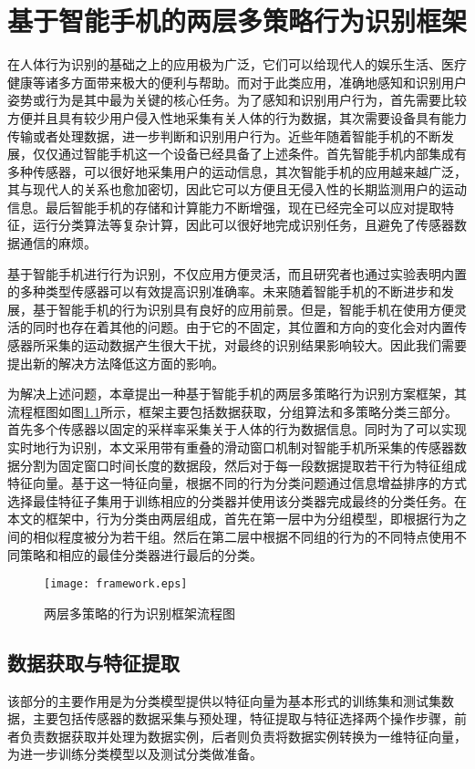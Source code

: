 \chapter{基于智能手机的两层多策略行为识别框架}

\par 在人体行为识别的基础之上的应用极为广泛，它们可以给现代人的娱乐生活、医疗健康等诸多方面带来极大的便利与帮助。而对于此类应用，准确地感知和识别用户姿势或行为是其中最为关键的核心任务。为了感知和识别用户行为，首先需要比较方便并且具有较少用户侵入性地采集有关人体的行为数据，其次需要设备具有能力传输或者处理数据，进一步判断和识别用户行为。近些年随着智能手机的不断发展，仅仅通过智能手机这一个设备已经具备了上述条件。首先智能手机内部集成有多种传感器，可以很好地采集用户的运动信息，其次智能手机的应用越来越广泛，其与现代人的关系也愈加密切，因此它可以方便且无侵入性的长期监测用户的运动信息。最后智能手机的存储和计算能力不断增强，现在已经完全可以应对提取特征，运行分类算法等复杂计算，因此可以很好地完成识别任务，且避免了传感器数据通信的麻烦。
\par 基于智能手机进行行为识别，不仅应用方便灵活，而且研究者也通过实验表明内置的多种类型传感器可以有效提高识别准确率。未来随着智能手机的不断进步和发展，基于智能手机的行为识别具有良好的应用前景。但是，智能手机在使用方便灵活的同时也存在着其他的问题。由于它的不固定，其位置和方向的变化会对内置传感器所采集的运动数据产生很大干扰，对最终的识别结果影响较大。因此我们需要提出新的解决方法降低这方面的影响。
\par 为解决上述问题，本章提出一种基于智能手机的两层多策略行为识别方案框架，其流程框图如图\ref{framework}所示，框架主要包括数据获取，分组算法和多策略分类三部分。首先多个传感器以固定的采样率采集关于人体的行为数据信息。同时为了可以实现实时地行为识别，本文采用带有重叠的滑动窗口机制对智能手机所采集的传感器数据分割为固定窗口时间长度的数据段，然后对于每一段数据提取若干行为特征组成特征向量。基于这一特征向量，根据不同的行为分类问题通过信息增益排序的方式选择最佳特征子集用于训练相应的分类器并使用该分类器完成最终的分类任务。在本文的框架中，行为分类由两层组成，首先在第一层中为分组模型，即根据行为之间的相似程度被分为若干组。然后在第二层中根据不同组的行为的不同特点使用不同策略和相应的最佳分类器进行最后的分类。
\begin{figure}[ht]
\centering
\texttt{[image: framework.eps]}
\caption{两层多策略的行为识别框架流程图} \label{framework}
\end{figure}

\section{数据获取与特征提取}
    \par 该部分的主要作用是为分类模型提供以特征向量为基本形式的训练集和测试集数据，主要包括传感器的数据采集与预处理，特征提取与特征选择两个操作步骤，前者负责数据获取并处理为数据实例，后者则负责将数据实例转换为一维特征向量，为进一步训练分类模型以及测试分类做准备\cite{wu2012classification}\cite{gupta2014feature}。
